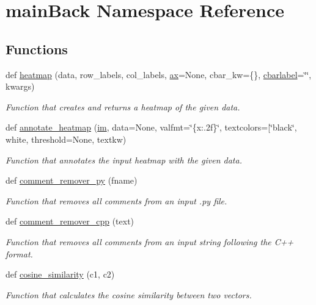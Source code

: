\hypertarget{namespacemain_back}{}\section{main\+Back Namespace Reference}
\label{namespacemain_back}
\subsection*{Functions}
\begin{DoxyCompactItemize}
\item 
def \hyperlink{namespacemain_back_a6e34e76908b8cfd5fda4efaaf6737d55}{heatmap} (data, row\+\_\+labels, col\+\_\+labels, \hyperlink{namespacemain_back_a38c2a7421333f3468e902a87b6e93173}{ax}=None, cbar\+\_\+kw=\{\}, \hyperlink{namespacemain_back_ae03335898c52325fcc32d469cb1a3222}{cbarlabel}=\char`\"{}\char`\"{}, kwargs)
\begin{DoxyCompactList}\small\item\em Function that creates and returns a heatmap of the given data. \end{DoxyCompactList}\item 
def \hyperlink{namespacemain_back_a7ad3aabd2ea6412049ac675944201dfa}{annotate\+\_\+heatmap} (\hyperlink{namespacemain_back_a2aabdc9357aa71da0c092014593e643e}{im}, data=None, valfmt=\char`\"{}\{x\+:.\+2f\}\char`\"{}, textcolors=\mbox{[}\char`\"{}black\char`\"{}, white, threshold=None, textkw)
\begin{DoxyCompactList}\small\item\em Function that annotates the input heatmap with the given data. \end{DoxyCompactList}\item 
def \hyperlink{namespacemain_back_a143f8fc662e5d0efc0118244031af2e1}{comment\+\_\+remover\+\_\+py} (fname)
\begin{DoxyCompactList}\small\item\em Function that removes all comments from an input .py file. \end{DoxyCompactList}\item 
def \hyperlink{namespacemain_back_a35b3762c7d4ae120ebcb9140f21ab99e}{comment\+\_\+remover\+\_\+cpp} (text)
\begin{DoxyCompactList}\small\item\em Function that removes all comments from an input string following the C++ format. \end{DoxyCompactList}\item 
def \hyperlink{namespacemain_back_a5dcd803071bf0623d43c399c733f233e}{cosine\+\_\+similarity} (c1, c2)
\begin{DoxyCompactList}\small\item\em Function that calculates the cosine similarity between two vectors. \end{DoxyCompactList}\end{DoxyCompactItemize}
